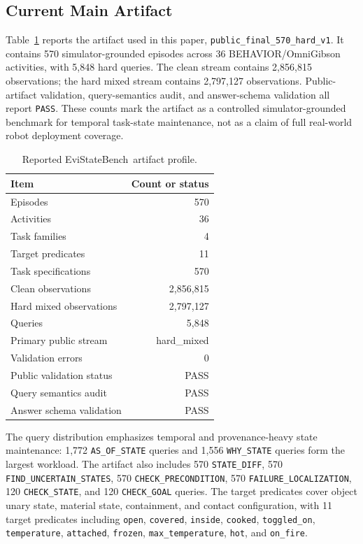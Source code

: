 \documentclass[conference]{IEEEtran}
\newcommand{\bench}{EviStateBench}
\begin{document}
\subsection{Current Main Artifact}

Table~\ref{tab:artifact} reports the artifact used in this paper, \texttt{public\_final\_570\_hard\_v1}. It contains 570 simulator-grounded episodes across 36 BEHAVIOR/OmniGibson activities, with 5,848 hard queries. The clean stream contains 2,856,815 observations; the hard mixed stream contains 2,797,127 observations. Public-artifact validation, query-semantics audit, and answer-schema validation all report \texttt{PASS}. These counts mark the artifact as a controlled simulator-grounded benchmark for temporal task-state maintenance, not as a claim of full real-world robot deployment coverage.

\begin{table}[!t]
\caption{Reported \bench\ artifact profile.}
\label{tab:artifact}
\centering
\footnotesize
\begin{tabular}{lr}
\toprule
Item & Count or status \\
\midrule
Episodes & 570 \\
Activities & 36 \\
Task families & 4 \\
Target predicates & 11 \\
Task specifications & 570 \\
Clean observations & 2,856,815 \\
Hard mixed observations & 2,797,127 \\
Queries & 5,848 \\
Primary public stream & hard\_mixed \\
Validation errors & 0 \\
Public validation status & PASS \\
Query semantics audit & PASS \\
Answer schema validation & PASS \\
\bottomrule
\end{tabular}
\end{table}

The query distribution emphasizes temporal and provenance-heavy state maintenance: 1,772 \texttt{AS\_OF\_STATE} queries and 1,556 \texttt{WHY\_STATE} queries form the largest workload. The artifact also includes 570 \texttt{STATE\_DIFF}, 570 \texttt{FIND\_UNCERTAIN\_STATES}, 570 \texttt{CHECK\_PRECONDITION}, 570 \texttt{FAILURE\_LOCALIZATION}, 120 \texttt{CHECK\_STATE}, and 120 \texttt{CHECK\_GOAL} queries. The target predicates cover object unary state, material state, containment, and contact configuration, with 11 target predicates including \texttt{open}, \texttt{covered}, \texttt{inside}, \texttt{cooked}, \texttt{toggled\_on}, \texttt{temperature}, \texttt{attached}, \texttt{frozen}, \texttt{max\_temperature}, \texttt{hot}, and \texttt{on\_fire}.
\end{document}

